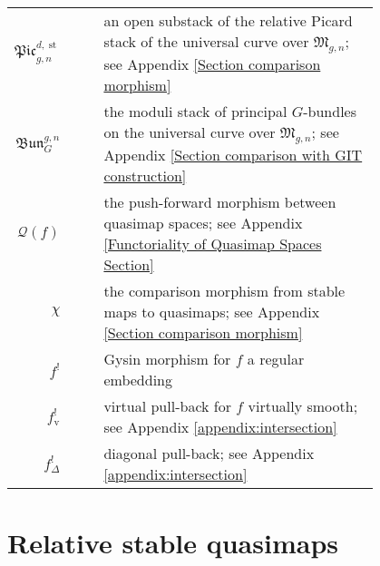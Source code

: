 \documentclass[11pt]{amsart}
\newcommand{\MM}{\mathfrak M}
\newcommand{\om}[1]{\mathcal{#1}}
\theoremstyle{definition}
\theoremstyle{definition}
\begin{document}
\begin{longtabu}{r c c p{0.8\linewidth}}
$\mathfrak{Pic}_{g,n}^{d,\operatorname{st}}$ & & & an open substack of the relative Picard stack of the universal curve over $\MM_{g,n}$; see Appendix  \ref{Section comparison morphism} \\
$\mathfrak{Bun}_{G}^{g,n}$ & & & the moduli stack of principal $G$-bundles on the universal curve over $\MM_{g,n}$; see Appendix \ref{Section comparison with GIT construction} \\
$\om{Q}(f)$ & & & the push-forward morphism between quasimap spaces; see Appendix \ref{Functoriality of Quasimap Spaces Section} \\
$\chi$ & & & the comparison morphism from stable maps to quasimaps; see Appendix \ref{Section comparison morphism} \\
$f^!$ & & & Gysin morphism for $f$ a regular embedding \\
$f^!_{\text{v}}$ & & & virtual pull-back for $f$ virtually smooth; see Appendix \ref{appendix:intersection} \\
$f^!_{\Delta}$ & & & diagonal pull-back; see Appendix \ref{appendix:intersection}
\end{longtabu}

\section{Relative stable quasimaps} \label{Section relative stable quasimaps}
\end{document}
